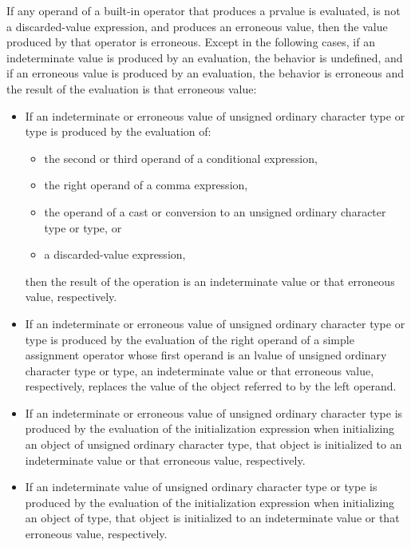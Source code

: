 \pnum
If any operand of a built-in operator that produces a prvalue
is evaluated,
is not a discarded-value expression, and
produces an erroneous value,
then the value produced by that operator is erroneous.
Except in the following cases,
if an indeterminate value is produced by an evaluation,
the behavior is undefined, and
if an erroneous value is produced by an evaluation,
the behavior is erroneous and
the result of the evaluation is that erroneous value:
\begin{itemize}
\item
  If an indeterminate or erroneous value of
  unsigned ordinary character type
  or  type
  is produced by the evaluation of:
  \begin{itemize}
  \item
    the second or third operand of a conditional expression,
  \item
    the right operand of a comma expression,
  \item
    the operand of a cast or conversion
    to an unsigned ordinary character type
    or  type, or
  \item
    a discarded-value expression,
  \end{itemize}
  then the result of the operation is an indeterminate value or
  that erroneous value, respectively.
\item
  If an indeterminate or erroneous value of
  unsigned ordinary character type or  type
  is produced by the evaluation of
  the right operand of a simple assignment operator
  whose first operand is an lvalue of
  unsigned ordinary character type or  type,
  an indeterminate value or that erroneous value, respectively, replaces
  the value of the object referred to by the left operand.
\item
  If an indeterminate or erroneous value of unsigned ordinary character type
  is produced by the evaluation of the initialization expression
  when initializing an object of unsigned ordinary character type,
  that object is initialized to an indeterminate
  value or that erroneous value, respectively.
\item
  If an indeterminate value of
  unsigned ordinary character type or  type
  is produced by the evaluation of the initialization expression
  when initializing an object of  type,
  that object is initialized to an indeterminate value or
  that erroneous value, respectively.
\end{itemize}

